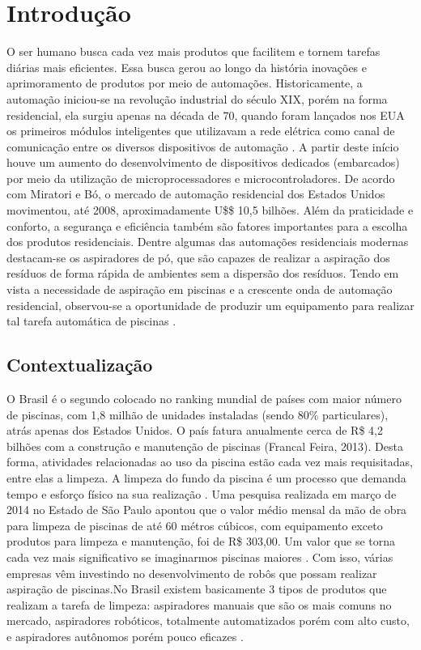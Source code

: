 \chapter{Introdução}
O ser humano busca cada vez mais produtos que facilitem e tornem tarefas 
diárias mais eficientes. Essa busca gerou ao longo da história inovações e 
aprimoramento de produtos por meio de automações. Historicamente, a automação 
iniciou-se na revolução industrial do século XIX, porém na forma residencial, 
ela surgiu apenas na década de 70, quando foram lançados nos EUA os primeiros 
módulos inteligentes que utilizavam a rede elétrica como canal de comunicação 
entre os diversos dispositivos de automação \cite{sra}. A partir deste início 
houve um aumento do desenvolvimento de dispositivos dedicados (embarcados) por 
meio da utilização de microprocessadores e microcontroladores. De acordo com 
Miratori e Bó, o mercado de automação residencial dos Estados Unidos 
movimentou, até 2008, aproximadamente U\$\$ 10,5 bilhões. Além da praticidade 
e conforto, a segurança e eficiência também são fatores importantes para a 
escolha dos produtos residenciais. Dentre algumas das automações residenciais 
modernas destacam-se os aspiradores de pó, que são capazes de realizar a 
aspiração dos resíduos de forma rápida de ambientes sem a dispersão dos 
resíduos. Tendo em vista a necessidade de aspiração em piscinas e a crescente 
onda de automação residencial, observou-se a oportunidade de produzir um 
equipamento para realizar tal tarefa automática de piscinas \cite{kanno2014}.

\section{Contextualização}
O Brasil é o segundo colocado no ranking mundial de países com maior número de 
piscinas, com 1,8 milhão de unidades instaladas (sendo 80\% particulares), 
atrás apenas dos Estados Unidos. O país fatura anualmente cerca de R\$ 4,2 
bilhões com a construção e manutenção de piscinas (Francal Feira, 2013). Desta 
forma, atividades relacionadas ao uso da piscina estão cada vez mais 
requisitadas, entre elas a limpeza. A limpeza do fundo da piscina é um processo
que demanda tempo e esforço físico na sua realização . Uma pesquisa realizada 
em  março de 2014 no Estado de São Paulo apontou que o valor médio mensal da 
mão de obra para limpeza de piscinas de até 60 métros cúbicos, com equipamento exceto 
produtos para limpeza e manutenção,  foi de R\$ 303,00. Um valor que se torna 
cada vez mais significativo se imaginarmos piscinas maiores \cite{datafolha2014}. 
Com isso, várias empresas vêm investindo no desenvolvimento de robôs que possam
realizar aspiração de piscinas.No Brasil existem basicamente 3 tipos de 
produtos que realizam a tarefa de limpeza: aspiradores manuais que são os mais 
comuns no mercado, aspiradores robóticos, totalmente automatizados porém com 
alto custo, e aspiradores autônomos porém pouco eficazes \cite{miura2006}.

